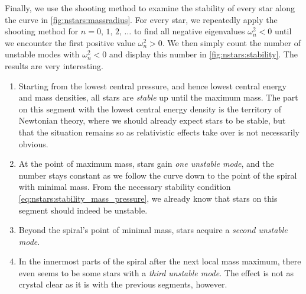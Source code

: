 Finally, we use the shooting method to examine the stability of every star along the curve in \cref{fig:nstars:massradius}.
For every star, we repeatedly apply the shooting method for $n = 0, \, 1, \, 2, \, \ldots$ to find all negative eigenvalues $\omega_n^2 < 0$ until we encounter the first positive value $\omega_n^2 > 0$.
We then simply count the number of unstable modes with $\omega_n^2 < 0$ and display this number in \cref{fig:nstars:stability}.
The results are very interesting.
\begin{enumerate}
\item Starting from the lowest central pressure, and hence lowest central energy and mass densities, all stars are \emph{stable} up until the maximum mass.
      The part on this segment with the lowest central energy density is the territory of Newtonian theory, where we should already expect stars to be stable, but that the situation remains so as relativistic effects take over is not necessarily obvious.
\item At the point of maximum mass, stars gain \emph{one unstable mode}, and the number stays constant as we follow the curve down to the point of the spiral with minimal mass.
      From the necessary stability condition \eqref{eq:nstars:stability_mass_pressure}, we already know that stars on this segment should indeed be unstable.
\item Beyond the spiral's point of minimal mass, stars acquire a \emph{second unstable mode}.
\item In the innermost parts of the spiral after the next local mass maximum, there even seems to be some stars with a \emph{third unstable mode}.
      The effect is not as crystal clear as it is with the previous segments, however.
\end{enumerate}

